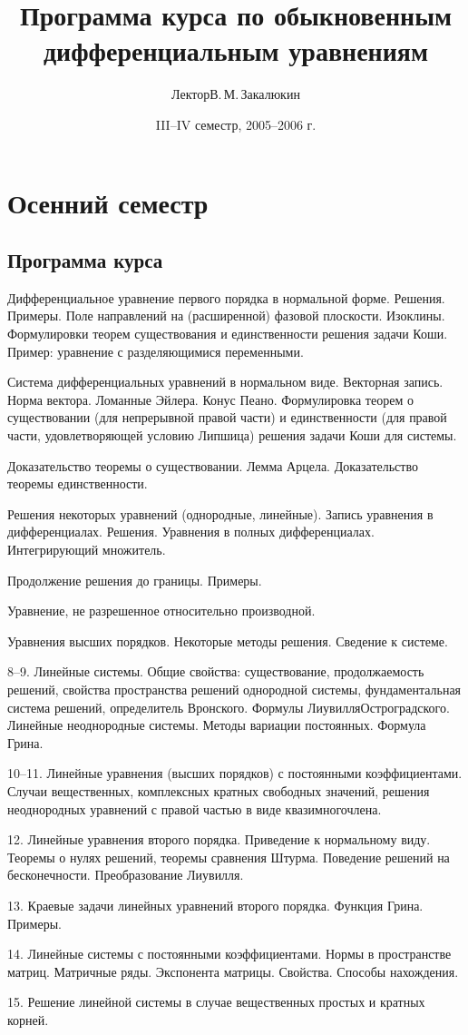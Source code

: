 \documentclass[a4paper]{article}
\title{Программа курса по обыкновенным\\ дифференциальным уравнениям}
\author{Лектор\т В.\,М.\,Закалюкин}
\date{III--IV семестр, 2005--2006 г.}
\begin{document}
\maketitle
\section{Осенний семестр}

\subsection{Программа курса}

\begin{nums}{-3}
\item Дифференциальное уравнение первого порядка в нормальной форме.
Решения. Примеры. Поле направлений на (расширенной) фазовой
плоскости. Изоклины. Формулировки теорем существования и
единственности решения задачи Коши. Пример: уравнение с
разделяющимися переменными.
\item Система дифференциальных уравнений в нормальном виде. Векторная
запись. Норма вектора. Ломанные Эйлера. Конус Пеано. Формулировка
теорем о существовании (для непрерывной правой части) и
единственности (для правой части, удовлетворяющей условию Липшица)
решения задачи Коши для системы.
\item Доказательство теоремы о существовании. Лемма Арцела.
Доказательство теоремы единственности.
\item Решения некоторых уравнений (однородные, линейные). Запись
уравнения в дифференциалах. Решения. Уравнения в полных
дифференциалах. Интегрирующий множитель.
\item Продолжение решения до границы. Примеры.
\item Уравнение, не разрешенное относительно производной.
\item Уравнения высших порядков. Некоторые методы решения. Сведение к
системе.
\item[8--9.]
Линейные системы. Общие свойства: существование, продолжаемость
решений, свойства пространства решений однородной системы,
фундаментальная система решений, определитель Вронского. Формулы
Лиувилля\ч Остроградского. Линейные неоднородные системы. Методы
вариации постоянных. Формула Грина.
\item[10--11.] Линейные уравнения (высших порядков) с постоянными
коэффициентами. Случаи вещественных, комплексных кратных свободных
значений, решения неоднородных уравнений с правой частью в виде
квазимногочлена.
\item[12.]
Линейные уравнения второго порядка. Приведение к нормальному виду.
Теоремы о нулях решений, теоремы сравнения Штурма. Поведение
решений на бесконечности. Преобразование Лиувилля.
\item[13.]
Краевые задачи линейных уравнений второго порядка. Функция Грина.
Примеры.
\item[14.]
Линейные системы с постоянными коэффициентами. Нормы в
пространстве матриц. Матричные ряды. Экспонента матрицы. Свойства.
Способы нахождения.
\item[15.]
Решение линейной системы в случае вещественных простых и кратных
корней.
\end{nums}
\end{document}
